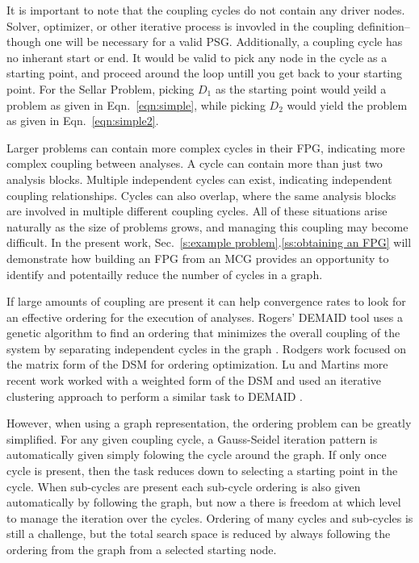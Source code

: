   It is important to note that the coupling cycles do not contain 
  any driver nodes. Solver, optimizer, or other iterative process is 
  invovled in the coupling definition--though one will be necessary for a valid 
  PSG. Additionally, a coupling cycle has no inherant start or end. It would be
  valid to pick any node in the cycle as a starting point, and proceed around the
  loop untill you get back to your starting point. For the Sellar Problem, picking 
  $D_1$ as the starting point would yeild a problem as given in 
  Eqn.~\ref{eqn:simple}, while picking $D_2$ would yield the problem as given in 
  Eqn.~\ref{eqn:simple2}.

  Larger problems can contain more complex cycles in their FPG, indicating more 
  complex coupling between analyses. A cycle can contain more than 
  just two analysis blocks. Multiple independent cycles can exist, indicating 
  independent coupling relationships. Cycles can also overlap, where the same analysis 
  blocks are involved in multiple different coupling cycles. All of these situations
  arise naturally as the size of problems grows, and managing this coupling may
  become difficult. In the present work, Sec.~\ref{s:example problem}.\ref{ss:obtaining an FPG} 
  will demonstrate how building an FPG from an MCG provides an opportunity to 
  identify and potentailly reduce the number of cycles in a graph. 

  If large amounts of coupling are present it can help convergence 
  rates to look for an effective ordering for the execution of analyses.
  Rogers' DEMAID tool uses a genetic algorithm to find an ordering that minimizes 
  the overall coupling of the system by separating independent cycles in the 
  graph \cite{rogers1996,rogers1996demaid}. Rodgers work focused on the matrix 
  form of the DSM for ordering optimization. Lu and Martins more recent work 
  worked with a weighted form of the DSM and used an iterative clustering approach 
  to perform a similar task to DEMAID \cite{Lu2012}. 

  However, when using a graph representation, the ordering problem can be greatly 
  simplified. For any given coupling cycle, a Gauss-Seidel iteration pattern 
  is automatically given simply folowing the cycle around the graph. If only 
  once cycle is present, then the task reduces down to selecting a starting point
  in the cycle. When sub-cycles are present each sub-cycle ordering is also 
  given automatically by following the graph, but now a there is freedom at which 
  level to manage the iteration over the cycles. Ordering of many cycles and 
  sub-cycles is still a challenge, but the total search space is reduced by 
  always following the ordering from the graph from a selected starting node. 

